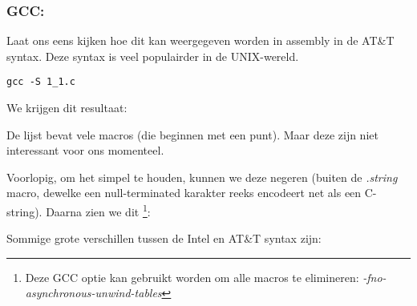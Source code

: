 \subsubsection{GCC: \ATTSyntax}
\label{ATT_syntax}

Laat ons eens kijken hoe dit kan weergegeven worden in assembly in de AT\&T syntax.
Deze syntax is veel populairder in de UNIX-wereld.

\begin{lstlisting}[caption=\NLph{} GCC 4.7.3]
gcc -S 1_1.c
\end{lstlisting}

We krijgen dit resultaat:



De lijst bevat vele macros (die beginnen met een punt). Maar deze zijn niet interessant voor ons momenteel.

Voorlopig, om het simpel te houden, kunnen we deze negeren (buiten de \emph{.string} macro, dewelke
een null-terminated karakter reeks encodeert net als een C-string). Daarna zien we dit
\footnote{Deze GCC optie kan gebruikt worden om alle  macros te elimineren: \emph{-fno-asynchronous-unwind-tables}}:



\myindex{\ATTSyntax}
\myindex{\IntelSyntax}
Sommige grote verschillen tussen de Intel en AT\&T syntax zijn:

